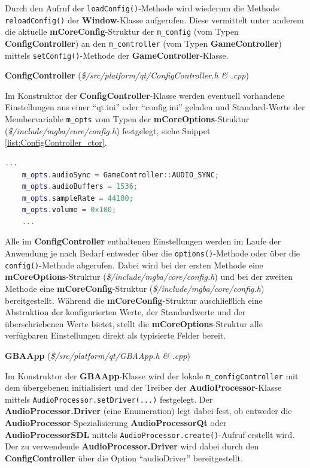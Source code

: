 \documentclass[11pt,a4paper]{scrartcl}
\newcommand{\paratitlecode}[2] {
    \vspace{5mm}
    \large \textbf{#1} \normalsize(\textit{\${#2}})
    \vspace{2mm}\newline
}
\begin{document}
Durch den Aufruf der \verb|loadConfig()|-Methode wird wiederum die Methode \verb|reloadConfig()| der \textbf{Window}-Klasse aufgerufen. Diese vermittelt unter anderem die aktuelle \textbf{mCoreConfig}-Struktur der \verb|m_config| (vom Typen \textbf{ConfigController}) an den \verb|m_controller| (vom Typen \textbf{GameController}) mittels \verb|setConfig()|-Methode der \textbf{GameController}-Klasse.

\paratitlecode{ConfigController}{/src/platform/qt/ConfigController.h \& .cpp}
Im Konstruktor der \textbf{ConfigController}-Klasse werden eventuell vorhandene Einstellungen aus einer \enquote{qt.ini} oder \enquote{config.ini} geladen und Standard-Werte der Membervariable \verb|m_opts| vom Typen der \textbf{mCoreOptions}-Struktur (\textit{\$/include/mgba/core/config.h}) festgelegt, siehe Snippet \ref{list:ConfigController_ctor}.

\vspace{5mm}
\begin{lstlisting}[language=C++, caption={Ausschnitt aus dem Konstruktor der ConfigController-Klasse}, label={list:ConfigController_ctor}]
    ...
	m_opts.audioSync = GameController::AUDIO_SYNC;
	m_opts.audioBuffers = 1536;
	m_opts.sampleRate = 44100;
	m_opts.volume = 0x100;
	...
\end{lstlisting}

Alle im \textbf{ConfigController} enthaltenen Einstellungen werden im Laufe der Anwendung je nach Bedarf entweder \"uber die \verb|options()|-Methode oder \"uber die \verb|config()|-Methode abgerufen. Dabei wird bei der ersten Methode eine \textbf{mCoreOptions}-Struktur (\textit{\$/include/mgba/core/config.h}) und bei der zweiten Methode eine \textbf{mCoreConfig}-Struktur (\textit{\$/include/mgba/core/config.h}) bereitgestellt. W\"ahrend die \textbf{mCoreConfig}-Struktur auschlie{\ss}lich eine Abstraktion der konfigurierten Werte, der Standardwerte und der \"uberschriebenen Werte bietet, stellt die \textbf{mCoreOptions}-Struktur alle verf\"ugbaren Einstellungen direkt als typisierte Felder bereit.

\paratitlecode{GBAApp}{/src/platform/qt/GBAApp.h \& .cpp}
Im Konstruktor der \textbf{GBAApp}-Klasse wird der lokale \verb|m_configController| mit dem \"ubergebenen initialisiert und der Treiber der \textbf{AudioProcessor}-Klasse mittels \verb|AudioProcessor.setDriver(...)| festgelegt. Der \textbf{AudioProcessor.Driver} (eine Enumeration) legt dabei fest, ob entweder die \textbf{AudioProcessor}-Spezialisierung \textbf{AudioProcessorQt} oder \textbf{AudioProcessorSDL} mittels \verb|AudioProcessor.create()|-Aufruf erstellt wird. Der zu verwendende \textbf{AudioProcessor.Driver} wird dabei durch den \textbf{ConfigController} \"uber die Option \enquote{audioDriver} bereitgestellt.
\end{document}
